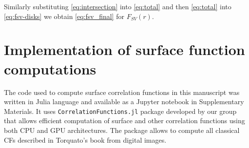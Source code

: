 \documentclass[reprint,amsmath,amssymb,aps,pre,showkeys,showpacs]{revtex4-1}
\newcommand{\code}[1]{\colorbox{light-gray}{\texttt{#1}}}
\begin{document}
Similarly substituting \cref{eq:intersection} into \cref{eq:total} and then
\cref{eq:total} into \cref{eq:fsv-disks} we obtain \cref{eq:fsv_final} for
$F_{SV}(r)$.

\section{Implementation of surface function computations}
\label{ap:b_code}
The code used to compute surface correlation functions in this manuscript was
written in Julia language and available as a Jupyter notebook in Supplementary
Materials. It uses \code{CorrelationFunctions.jl} package developed by our group
\cite{CFsjlpaper} that allows efficient computation of surface and other
correlation functions using both CPU and GPU architectures. The package allows to compute all classical CFs described in Torquato’s book
\cite{Torquato_book} from digital images.


\end{document}
